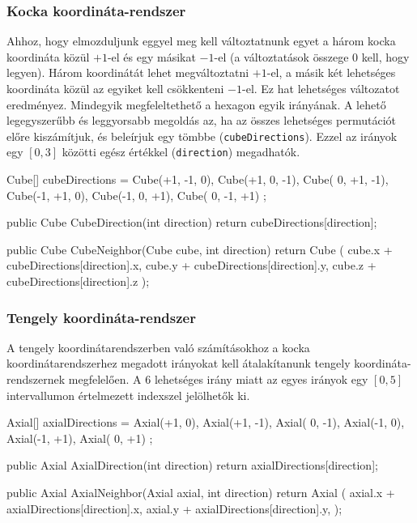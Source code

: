 \subsubsection{Kocka koordináta-rendszer}

Ahhoz, hogy elmozduljunk eggyel meg kell változtatnunk egyet a három kocka koordináta közül $+1$-el és egy másikat $-1$-el (a változtatások összege $0$ kell, hogy legyen). Három koordinátát lehet megváltoztatni $+1$-el, a másik két lehetséges koordináta közül az egyiket kell csökkenteni $-1$-el. Ez hat lehetséges változatot eredményez. Mindegyik megfeleltethető a hexagon egyik irányának. A lehető legegyszerűbb és leggyorsabb megoldás az, ha az összes lehetséges permutációt előre kiszámítjuk, és beleírjuk egy tömbbe (\texttt{cubeDirections}). Ezzel az irányok egy $[0, 3]$ közötti egész értékkel (\texttt{direction}) megadhatók.
\begin{cpp}
Cube[] cubeDirections = 
{ 
   Cube(+1, -1,  0), Cube(+1,  0, -1), Cube( 0, +1, -1),
   Cube(-1, +1,  0), Cube(-1,  0, +1), Cube( 0, -1, +1) 
};

public Cube CubeDirection(int direction)
{
   return cubeDirections[direction];
}

public Cube CubeNeighbor(Cube cube, int direction)
{
   return Cube
   (
      cube.x + cubeDirections[direction].x, 
      cube.y + cubeDirections[direction].y, 
      cube.z + cubeDirections[direction].z
   );
}
\end{cpp}

\subsubsection{Tengely koordináta-rendszer}

A tengely koordinátarendszerben való számításokhoz a kocka koordinátarendszerhez megadott irányokat kell átalakítanunk tengely koordináta-rendszernek megfelelően. A 6 lehetséges irány miatt az egyes irányok egy $[0, 5]$ intervallumon értelmezett indexszel jelölhetők ki.
\begin{cpp}
Axial[] axialDirections = 
{ 
   Axial(+1,  0), Axial(+1, -1), Axial( 0, -1),
   Axial(-1,  0), Axial(-1, +1), Axial( 0, +1)
};

public Axial AxialDirection(int direction)
{
   return axialDirections[direction];
}

public Axial AxialNeighbor(Axial axial, int direction)
{
   return Axial
   (
      axial.x + axialDirections[direction].x, 
      axial.y + axialDirections[direction].y, 
   );
}
\end{cpp}

